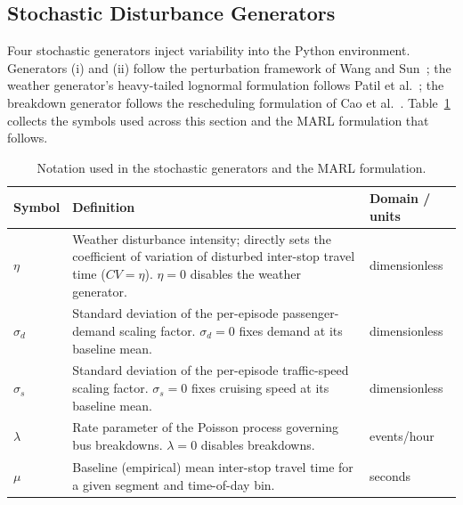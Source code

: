 \subsection{Stochastic Disturbance Generators}
\label{subsec:stochastic-vars}

Four stochastic generators inject variability into the Python environment. Generators (i) and (ii) follow the perturbation framework of Wang and Sun~\cite{Wangsun}; the weather generator's heavy-tailed lognormal formulation follows Patil et al.~\cite{Patil2025Conformal}; the breakdown generator follows the rescheduling formulation of Cao et al.~\cite{Cao2022Train}. Table~\ref{tab:notation} collects the symbols used across this section and the MARL formulation that follows.

\begin{table}[htbp]
\centering
\caption{Notation used in the stochastic generators and the MARL formulation.}
\label{tab:notation}

\small
\renewcommand{\arraystretch}{1.25}

\begin{tabularx}{\textwidth}{
>{\RaggedRight\arraybackslash}p{}
>{\RaggedRight\arraybackslash}X
>{\RaggedRight\arraybackslash}p{}
}

\toprule
\textbf{Symbol} & \textbf{Definition} & \textbf{Domain / units} \\
\midrule

$\eta$ &
Weather disturbance intensity; directly sets the coefficient of variation of disturbed inter-stop travel time ($CV=\eta$). $\eta=0$ disables the weather generator. &
dimensionless \\

$\sigma_d$ &
Standard deviation of the per-episode passenger-demand scaling factor. $\sigma_d=0$ fixes demand at its baseline mean. &
dimensionless \\

$\sigma_s$ &
Standard deviation of the per-episode traffic-speed scaling factor. $\sigma_s=0$ fixes cruising speed at its baseline mean. &
dimensionless \\

$\lambda$ &
Rate parameter of the Poisson process governing bus breakdowns. $\lambda=0$ disables breakdowns. &
events/hour \\

$\mu$ &
Baseline (empirical) mean inter-stop travel time for a given segment and time-of-day bin. &
seconds \\


\end{tabularx}
\end{table}
